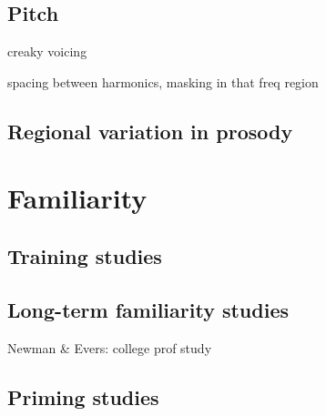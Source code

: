 \subsection{Pitch}
\begin{itm}
	\item{creaky voicing}
	\item{spacing between harmonics, masking in that freq region}
\end{itm}

\subsection{Regional variation in prosody}

\section{Familiarity}
\subsection{Training studies}
\subsection{Long-term familiarity studies}
Newman \& Evers: college prof study\citep{NewmanEvers2007}

\subsection{Priming studies}
